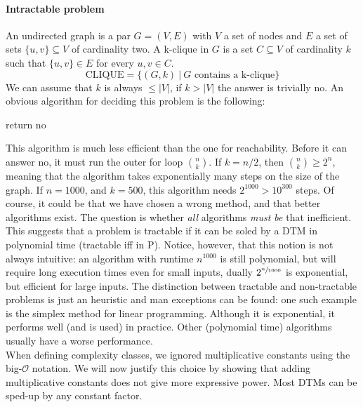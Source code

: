 \documentclass{report}
\begin{document}
\paragraph{Intractable problem} An undirected graph is a par $G=(V,E)$ with $V$ a set of nodes and $E$ a set of sets $\{u,v\}\subseteq V$ of cardinality two. A k-clique in $G$ is a set $C \subseteq V$ of cardinality $k$ such that $\{u,v\} \in E$ for every $u,v \in C$.
\[
\text{CLIQUE} = \{(G,k)\ |\ G \text{ contains a k-clique}\} 
\]
We can assume that $k$ is always $\leq|V|$, if $k>|V|$ the answer is trivially no. An obvious algorithm  for deciding this problem is the following:
\begin{algorithm}[h]\label{alg:clique}
return no\;
\end{algorithm}

This algorithm is much less efficient than the one for reachability. Before it can answer no, it must run the outer for loop $n \choose k$. If  $k=n/2$, then ${n \choose k} \geq 2^n$, meaning that the algorithm takes exponentially many steps on the size of the graph. If $n=1000$, and $k=500$, this algorithm needs $2^{1000} > 10^{300}$ steps. Of course, it could be that we have chosen a wrong method, and that better algorithms exist. The question is whether \textit{all} algorithms \textit{must be} that inefficient.\\

This suggests that a problem is tractable if it can be soled by a DTM in polynomial time (tractable iff in P). Notice, however, that this notion is not always intuitive: an algorithm with runtime $n^{1000}$ is still polynomial, but will require long execution times even for small inputs, dually $2^{\sfrac{n}{1000}}$ is exponential, but efficient for large inputs. The distinction between tractable and non-tractable problems is just an heuristic and man exceptions can be found: one such example is the simplex method for linear programming. Although it is exponential, it performs well (and is used) in practice. Other (polynomial time) algorithms usually have a worse performance.\\

When defining complexity classes, we ignored multiplicative constants using the big-$\mathcal{O}$ notation. We will now justify this choice by showing that adding multiplicative constants does not give more expressive power. Most DTMs can be sped-up by any constant factor.
\end{document}
